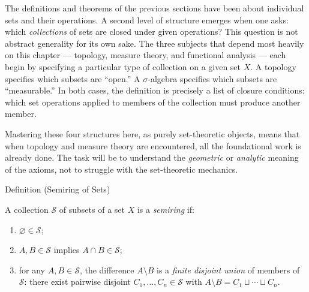 \begin{exposition}
The definitions and theorems of the previous sections have been about
individual sets and their operations. A second level of structure emerges
when one asks: which \emph{collections} of sets are closed under given
operations? This question is not abstract generality for its own sake. The
three subjects that depend most heavily on this chapter — topology, measure
theory, and functional analysis — each begin by specifying a particular type
of collection on a given set $X$. A topology specifies which subsets are
``open.'' A $\sigma$-algebra specifies which subsets are ``measurable.'' In
both cases, the definition is precisely a list of closure conditions: which
set operations applied to members of the collection must produce another
member.
\end{exposition}

\begin{exposition}
Mastering these four structures here, as purely set-theoretic objects, means
that when topology and measure theory are encountered, all the foundational
work is already done. The task will be to understand the \emph{geometric} or
\emph{analytic} meaning of the axioms, not to struggle with the set-theoretic
mechanics.
\end{exposition}


\begin{definitionbox}{Definition (Semiring of Sets)}
\begin{definition}\label{def:semiring-of-sets}
A collection $\mathcal{S}$ of subsets of a set $X$ is a \emph{semiring} if:
\begin{enumerate}[label=(\roman*)]
\item $\varnothing \in \mathcal{S}$;
\item $A, B \in \mathcal{S}$ implies $A \cap B \in \mathcal{S}$;
\item for any $A, B \in \mathcal{S}$, the difference $A \setminus B$ is a
  \emph{finite disjoint union} of members of $\mathcal{S}$: there exist
  pairwise disjoint $C_1, \dots, C_n \in \mathcal{S}$ with
  $A \setminus B = C_1 \sqcup \cdots \sqcup C_n$.
\end{enumerate}
\end{definition}
\end{definitionbox}

